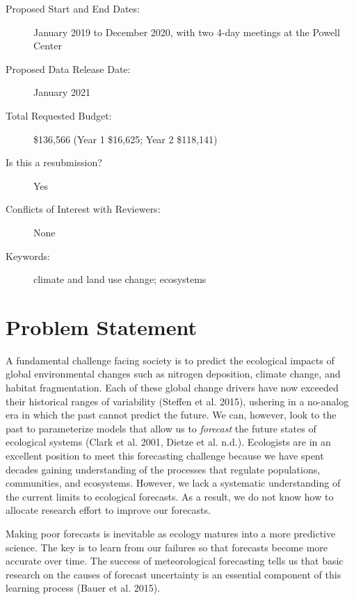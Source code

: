 \documentclass[12pt,]{article}
\begin{document}
\begin{description}
\item[Proposed Start and End Dates:] January 2019 to December 2020, with two 4-day meetings at the Powell Center
\item[Proposed Data Release Date:] January 2021
\item[Total Requested Budget:] \$136,566 (Year 1 \$16,625; Year 2 \$118,141)
\item[Is this a resubmission?] Yes
\item[Conflicts of Interest with Reviewers:] None
\item[Keywords:] climate and land use change; ecosystems
\end{description}

\newpage{}


\section{Problem Statement}

A fundamental challenge facing society is to predict the ecological
impacts of global environmental changes such as nitrogen deposition,
climate change, and habitat fragmentation. Each of these global change
drivers have now exceeded their historical ranges of variability
(Steffen et al. 2015), ushering in a no-analog era in which the past
cannot predict the future. We can, however, look to the past to
parameterize models that allow us to \emph{forecast} the future states
of ecological systems (Clark et al. 2001, Dietze et al. n.d.).
Ecologists are in an excellent position to meet this forecasting
challenge because we have spent decades gaining understanding of the
processes that regulate populations, communities, and ecosystems.
However, we lack a systematic understanding of the current limits to
ecological forecasts. As a result, we do not know how to allocate
research effort to improve our forecasts.

Making poor forecasts is inevitable as ecology matures into a more
predictive science. The key is to learn from our failures so that
forecasts become more accurate over time. The success of meteorological
forecasting tells us that basic research on the causes of forecast
uncertainty is an essential component of this learning process (Bauer et
al. 2015).
\end{document}

